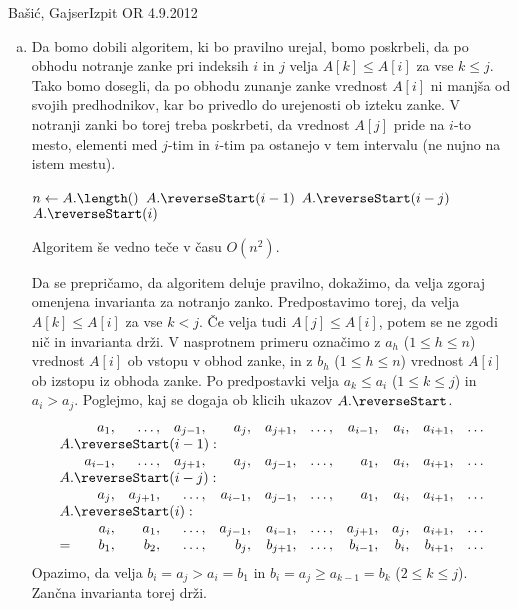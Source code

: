 \begin{naloga}{Bašić, Gajser}{Izpit OR 4.9.2012}
\begin{odgovor}
\begin{enumerate}[(a)]
\item Da bomo dobili algoritem, ki bo pravilno urejal, bomo poskrbeli,
da po obhodu notranje zanke pri indeksih $i$ in $j$
velja $A[k] \le A[i]$ za vse $k \le j$.
Tako bomo dosegli,
da po obhodu zunanje zanke vrednost $A[i]$ ni manjša od svojih predhodnikov,
kar bo privedlo do urejenosti ob izteku zanke.
V notranji zanki bo torej treba poskrbeti,
da vrednost $A[j]$ pride na $i$-to mesto,
elementi med $j$-tim in $i$-tim pa ostanejo v tem intervalu
(ne nujno na istem mestu).

\needspace{\baselineskip}
\begin{small}
\begin{algorithmic}
\State $n \gets A.\length()$
            \State $A.\reverseStart(i-1)$
            \State $A.\reverseStart(i-j)$
            \State $A.\reverseStart(i)$
        \EndIf
    \EndFor
\EndFor
\end{algorithmic}
\end{small}
Algoritem še vedno teče v času $O(n^2)$.

Da se prepričamo, da algoritem deluje pravilno,
dokažimo, da velja zgoraj omenjena invarianta za notranjo zanko.
Predpostavimo torej, da velja $A[k] \le A[i]$ za vse $k < j$.
Če velja tudi $A[j] \le A[i]$, potem se ne zgodi nič in invarianta drži.
V nasprotnem primeru označimo z $a_h$ ($1 \le h \le n$)
vrednost $A[i]$ ob vstopu v obhod zanke,
in z $b_h$ ($1 \le h \le n$) vrednost $A[i]$ ob izstopu iz obhoda zanke.
Po predpostavki velja $a_k \le a_i$ ($1 \le k \le j$) in $a_i > a_j$.
Poglejmo, kaj se dogaja ob klicih ukazov $A.\reverseStart$.
$$
\begin{array}{rrrrrrrrrrr}
& a_1, & \dots, & a_{j-1}, & a_j, & a_{j+1}, & \dots, & a_{i-1}, & a_i, & a_{i+1}, & \dots \\
\multicolumn{11}{l}{A.\reverseStart(i-1):} \\
& a_{i-1}, & \dots, & a_{j+1}, & a_j, & a_{j-1}, & \dots, & a_1, & a_i, & a_{i+1}, & \dots \\
\multicolumn{11}{l}{A.\reverseStart(i-j):} \\
& a_j, & a_{j+1}, & \dots, & a_{i-1}, & a_{j-1}, & \dots, & a_1, & a_i, & a_{i+1}, & \dots \\
\multicolumn{11}{l}{A.\reverseStart(i):} \\
& a_i, & a_1, & \dots, & a_{j-1}, & a_{i-1}, & \dots, & a_{j+1}, & a_j, & a_{i+1}, & \dots \\
= & b_1, & b_2, & \dots, & b_j, & b_{j+1}, & \dots, & b_{i-1}, & b_i, & b_{i+1}, & \dots
\end{array}
$$
Opazimo,
da velja $b_i = a_j > a_i = b_1$
in $b_i = a_j \ge a_{k-1} = b_k$ ($2 \le k \le j$).
Zančna invarianta torej drži.


\end{enumerate}
\end{odgovor}
\end{naloga}
